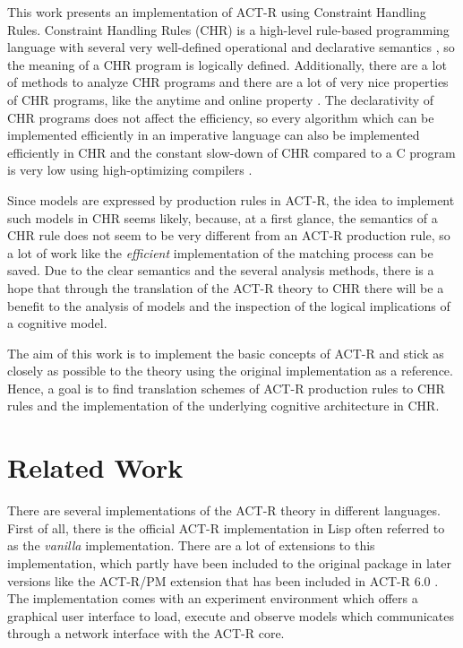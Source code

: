 This work presents an implementation of ACT-R using Constraint Handling Rules. Constraint Handling Rules (CHR) is a high-level rule-based programming language with several very well-defined operational and declarative semantics \cite[49\psqq]{fru_chr_book_2009}, so the meaning of a CHR program is logically defined. Additionally, there are a lot of methods to analyze CHR programs \cite[96\psqq]{fru_chr_book_2009} and there are a lot of very nice properties of CHR programs, like the anytime and online property \cite[83\psqq]{fru_chr_book_2009}. The declarativity of CHR programs does not affect the efficiency, so every algorithm which can be implemented efficiently in an imperative language can also be implemented efficiently in CHR and the constant slow-down of CHR compared to a C program is very low using high-optimizing compilers \cite[94]{fru_chr_book_2009}.

Since models are expressed by production rules in ACT-R, the idea to implement such models in CHR seems likely, because, at a first glance, the semantics of a CHR rule does not seem to be very different from an ACT-R production rule, so a lot of work like the \emph{efficient} implementation of the matching process can be saved. Due to the clear semantics and the several analysis methods, there is a hope that through the translation of the ACT-R theory to CHR there will be a benefit to the analysis of models and the inspection of the logical implications of a cognitive model.

The aim of this work is to implement the basic concepts of ACT-R and stick as closely as possible to the theory using the original implementation as a reference. Hence, a goal is to find translation schemes of ACT-R production rules to CHR rules and the implementation of the underlying cognitive architecture in CHR.

\section{Related Work}

There are several implementations of the ACT-R theory in different languages. First of all, there is the official ACT-R implementation in Lisp \cite{actr_homepage} often referred to as the \emph{vanilla} implementation. There are a lot of extensions to this implementation, which partly have been included to the original package in later versions like the ACT-R/PM extension that has been included in ACT-R 6.0 \cite[264]{actr_reference}. The implementation comes with an experiment environment which offers a graphical user interface to load, execute and observe models which communicates through a network interface with the ACT-R core.

